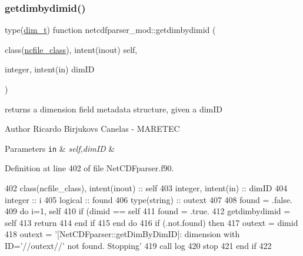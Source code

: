 \subsubsection{\texorpdfstring{getdimbydimid()}{getdimbydimid()}}
{\footnotesize\ttfamily type(\mbox{\hyperlink{structnetcdfparser__mod_1_1dim__t}{dim\+\_\+t}}) function netcdfparser\+\_\+mod\+::getdimbydimid (\begin{DoxyParamCaption}\item[{class(\mbox{\hyperlink{structnetcdfparser__mod_1_1ncfile__class}{ncfile\+\_\+class}}), intent(inout)}]{self,  }\item[{integer, intent(in)}]{dim\+ID }\end{DoxyParamCaption})\hspace{0.3cm}{\ttfamily [private]}}



returns a dimension field metadata structure, given a dim\+ID 

\begin{DoxyAuthor}{Author}
Ricardo Birjukovs Canelas -\/ M\+A\+R\+E\+T\+EC 
\end{DoxyAuthor}

\begin{DoxyParams}[1]{Parameters}
\mbox{\tt in}  & {\em self,dim\+ID} & \\
\hline
\end{DoxyParams}


Definition at line 402 of file Net\+C\+D\+Fparser.\+f90.


\begin{DoxyCode}
402     \textcolor{keywordtype}{class}(ncfile\_class), \textcolor{keywordtype}{intent(inout)} :: self
403     \textcolor{keywordtype}{integer}, \textcolor{keywordtype}{intent(in)} :: dimID
404     \textcolor{keywordtype}{integer} :: i
405     \textcolor{keywordtype}{logical} :: found
406     \textcolor{keywordtype}{type}(string) :: outext
407 
408     found = .false.
409     \textcolor{keywordflow}{do} i=1, self%
410         \textcolor{keywordflow}{if} (dimid == self%
411             found = .true.
412             getdimbydimid = self%
413             \textcolor{keywordflow}{return}
414 \textcolor{keywordflow}{        end if}
415 \textcolor{keywordflow}{    end do}
416     \textcolor{keywordflow}{if} (.not.found) \textcolor{keywordflow}{then}
417         outext = dimid
418         outext = \textcolor{stringliteral}{'[NetCDFparser::getDimByDimID]: dimension with ID='}//outext//\textcolor{stringliteral}{' not found. Stopping'}
419         \textcolor{keyword}{call }log%
420         stop
421 \textcolor{keywordflow}{    end if}
422 
\end{DoxyCode}
\mbox{\label{namespacenetcdfparser__mod_a57c39a4003778a6bf90cfd36b69380bc}} 
